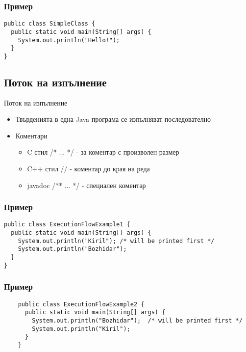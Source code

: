 \documentclass{beamer}
\begin{document}
\begin{frame}[fragile]
  \transdissolve
  \frametitle{Пример}
\begin{lstlisting}
public class SimpleClass {
  public static void main(String[] args) {
    System.out.println("Hello!");
  }
}
\end{lstlisting}
\end{frame}

\subsection{Поток на изпълнение}
\begin{frame}{Поток на изпълнение}
  \transdissolve  
  \begin{itemize}
    \item Твърденията в една Java програма се изпълняват последователно
    \item Коментари
      
      \begin{itemize}
        \item C стил /* ... */ - за коментар с произволен размер
        \item C++ стил // - коментар до края на реда
        \item javadoc /** ... */ - специален коментар
      \end{itemize}

  \end{itemize}

\end{frame}

\begin{frame}[fragile]
  \frametitle{Пример}
  \transdissolve
  \begin{lstlisting}
public class ExecutionFlowExample1 {
  public static void main(String[] args) {
    System.out.println("Kiril"); /* will be printed first */
    System.out.println("Bozhidar");
  }
}
  \end{lstlisting}
\end{frame}

\begin{frame}[fragile]
  \frametitle{Пример}
  \transdissolve
  \begin{lstlisting}
    public class ExecutionFlowExample2 {
      public static void main(String[] args) {
        System.out.println("Bozhidar");  /* will be printed first */
        System.out.println("Kiril");
      }
    }
  \end{lstlisting}
\end{frame}
\end{document}
